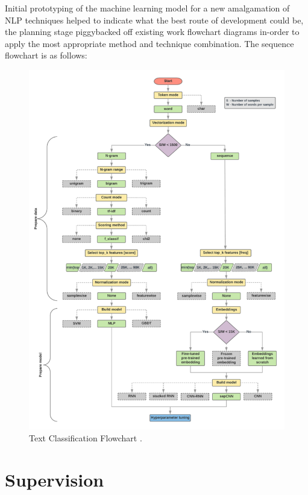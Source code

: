 Initial prototyping of the machine learning model for a new amalgamation of NLP techniques helped to indicate what the best route of development could be, the planning stage piggybacked off existing work flowchart diagrams in-order to apply the most appropriate method and technique combination. The sequence flowchart is as follows:

\begin{figure}[H]
    \centering
    \includegraphics[width=\textwidth]{figures/chapter-5/GooglePlan.pdf}
    \caption[GooglePlan]{Text Classification Flowchart \parencite{google2021TCF}.
    \label{fig:GooglePlan}}
\end{figure}

\section{Supervision}

